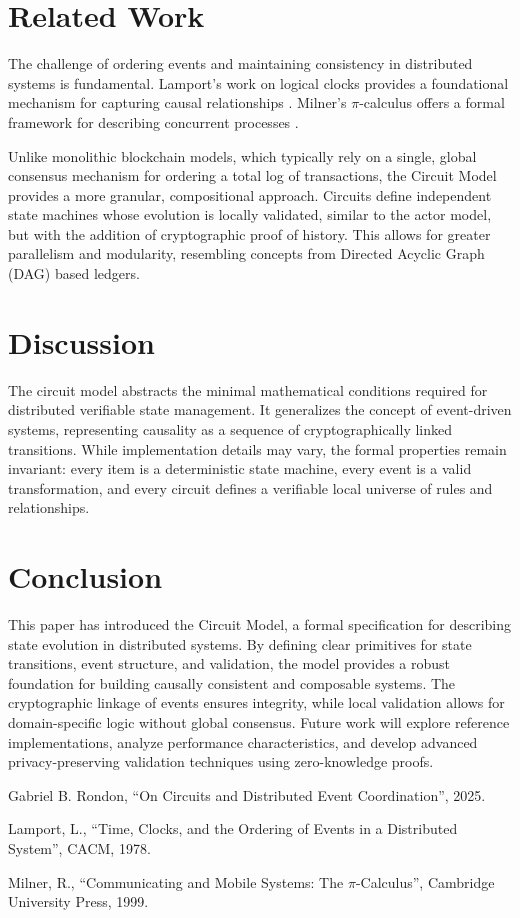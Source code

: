 \documentclass{article}
\begin{document}
\section{Related Work}

The challenge of ordering events and maintaining consistency in distributed systems is fundamental. Lamport's work on logical clocks provides a foundational mechanism for capturing causal relationships \cite{lamport1978}. Milner's $\pi$-calculus offers a formal framework for describing concurrent processes \cite{milner1999}. 

Unlike monolithic blockchain models, which typically rely on a single, global consensus mechanism for ordering a total log of transactions, the Circuit Model provides a more granular, compositional approach. Circuits define independent state machines whose evolution is locally validated, similar to the actor model, but with the addition of cryptographic proof of history. This allows for greater parallelism and modularity, resembling concepts from Directed Acyclic Graph (DAG) based ledgers.

\section{Discussion}

The circuit model abstracts the minimal mathematical conditions required for distributed verifiable state management. It generalizes the concept of event-driven systems, representing causality as a sequence of cryptographically linked transitions. While implementation details may vary, the formal properties remain invariant: every item is a deterministic state machine, every event is a valid transformation, and every circuit defines a verifiable local universe of rules and relationships.

\section{Conclusion}

This paper has introduced the Circuit Model, a formal specification for describing state evolution in distributed systems. By defining clear primitives for state transitions, event structure, and validation, the model provides a robust foundation for building causally consistent and composable systems. The cryptographic linkage of events ensures integrity, while local validation allows for domain-specific logic without global consensus. Future work will explore reference implementations, analyze performance characteristics, and develop advanced privacy-preserving validation techniques using zero-knowledge proofs.

\begin{thebibliography}{9}

Gabriel B. Rondon, “On Circuits and Distributed Event Coordination”, 2025.

Lamport, L., “Time, Clocks, and the Ordering of Events in a Distributed System”, CACM, 1978.

Milner, R., “Communicating and Mobile Systems: The $\pi$-Calculus”, Cambridge University Press, 1999.

\end{thebibliography}
\end{document}
